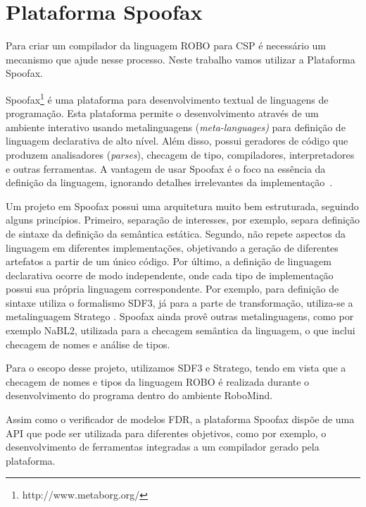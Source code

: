\section{Plataforma Spoofax}
\label{sec:compilacao}

Para criar um compilador da linguagem ROBO para CSP é necessário um mecanismo que ajude nesse processo. Neste trabalho vamos utilizar a Plataforma Spoofax.

Spoofax\footnote[7]{http://www.metaborg.org/} é uma plataforma para desenvolvimento textual de linguagens de programação. Esta plataforma permite o desenvolvimento através de um ambiente interativo usando metalinguagens (\textit{meta-languages)} para definição de linguagem declarativa de alto nível. Além disso, possui geradores de código que produzem analisadores (\textit{parses}), checagem de tipo, compiladores, interpretadores e outras ferramentas. A vantagem de usar Spoofax é o foco na essência da definição da linguagem, ignorando detalhes irrelevantes da implementação~\cite{KatsSpoofax}.

Um projeto em Spoofax possui uma arquitetura muito bem estruturada, seguindo alguns princípios. Primeiro, separação de interesses, por exemplo, separa definição de sintaxe da definição da semântica estática. Segundo, não repete aspectos da linguagem em diferentes implementações, objetivando a geração de diferentes artefatos a partir de um único código. Por último, a definição de linguagem declarativa ocorre de modo independente, onde cada tipo de implementação possui sua própria linguagem correspondente. Por exemplo, para definição de sintaxe utiliza o formalismo SDF3, já para a parte de transformação, utiliza-se a metalinguagem Stratego \cite{KatsSpoofax}. Spoofax ainda provê outras metalinguagens, como por exemplo NaBL2, utilizada para a checagem semântica da linguagem, o que inclui checagem de nomes e análise de tipos. 

Para o escopo desse projeto, utilizamos SDF3 e Stratego, tendo em vista que a checagem de nomes e tipos da linguagem ROBO é realizada durante o desenvolvimento do programa dentro do ambiente RoboMind. 

Assim como o verificador de modelos FDR, a plataforma Spoofax dispõe de uma API que pode ser utilizada para diferentes objetivos, como por exemplo, o desenvolvimento de ferramentas integradas a um compilador gerado pela plataforma.

